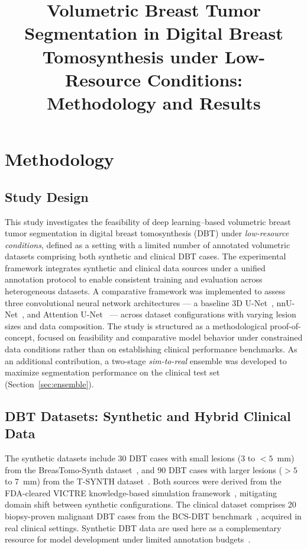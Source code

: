 \documentclass[11pt]{article}
\title{Volumetric Breast Tumor Segmentation in Digital Breast Tomosynthesis
under Low-Resource Conditions:\\ Methodology and Results}
\author{}
\date{}
\begin{document}
\maketitle

\section{Methodology}

\subsection{Study Design}
This study investigates the feasibility of deep learning--based volumetric breast
tumor segmentation in digital breast tomosynthesis (DBT) under \emph{low-resource
conditions}, defined as a setting with a limited number of annotated volumetric
datasets comprising both synthetic and clinical DBT cases. The experimental
framework integrates synthetic and clinical data sources under a unified annotation
protocol to enable consistent training and evaluation across heterogeneous datasets.
A comparative framework was implemented to assess three convolutional neural network
architectures --- a baseline 3D U-Net~\cite{cicek2016}, nnU-Net~\cite{isensee2021},
and Attention U-Net~\cite{oktay2018} --- across dataset configurations with varying
lesion sizes and data composition. The study is
structured as a methodological proof-of-concept, focused on feasibility and
comparative model behavior under constrained data conditions rather than on
establishing clinical performance benchmarks. As an additional contribution, a
two-stage \emph{sim-to-real} ensemble was developed to maximize segmentation
performance on the clinical test set (Section~\ref{sec:ensemble}).

\subsection{DBT Datasets: Synthetic and Hybrid Clinical Data}
The synthetic datasets include 30 DBT cases with small lesions
($3$ to $<5$~mm) from the BreasTomo-Synth dataset~\cite{breastomosynth}, and 90 DBT
cases with larger lesions ($>5$ to $7$~mm) from the T-SYNTH dataset~\cite{tsynth}.
Both sources were derived from the FDA-cleared VICTRE knowledge-based simulation
framework~\cite{victre_pipeline,badano2018}, mitigating domain shift between synthetic
configurations. The clinical dataset comprises 20 biopsy-proven malignant DBT cases
from the BCS-DBT benchmark~\cite{bcsdbt}, acquired in real clinical settings.
Synthetic DBT data are used here as a complementary resource for model development
under limited annotation budgets~\cite{alfaro2025}.
\end{document}
